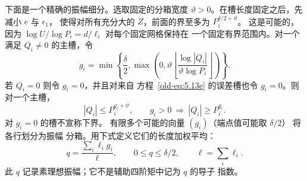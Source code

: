 下面是一个精确的振幅细分。选取固定的分箱宽度
\(\vartheta>0\)。在槽长度固定之后，先减小 \(e\) 与 \(\epsilon_1\)，
使得对所有充分大的 \(Z\)，前面的界至多为
\(P_i^{\delta/2+\vartheta}\)。
这是可能的，因为
\(\log U/\log P_i=d/\ell_i\) 对每个固定网格保持在
一个固定有界范围内。对一个满足 \(Q_i\ne0\) 的主槽，令
\[
 g_i=\min\left\{\frac{\delta}{2},
   \max\left(0,\vartheta
     \left\lfloor\frac{\log|Q_i|}{\vartheta\log P_i}\right\rfloor
   \right)\right\}.
\]
若 \(Q_i=0\) 则令 \(g_i=0\)，并且对来自
方程~\eqref{old-eq:5.13e} 的误差槽也令 \(g_i=0\)。则对一个主槽，
\[
 |Q_i|\le P_i^{g_i+\vartheta},\qquad
 g_i>0\ \Longrightarrow\ |Q_i|\ge P_i^{g_i}.
\]
对 \(g_i=0\) 的槽不宣称下界。
有限多个可能的向量 \((g_i)\)（端点值可能取 \(\delta/2\)）
将各行划分为振幅
分箱。用下式定义它们的长度加权平均：
\begin{equation}
 q=\frac{\sum_i\ell_i g_i}{\ell},\qquad
 0\le q\le\delta/2,\qquad \ell=\sum_i\ell_i.
 \label{old-eq:6.6}
\end{equation}
此 \(q\) 记录素理想振幅；它不是辅助四阶矩中记为 \(q\) 的导子
指数。
